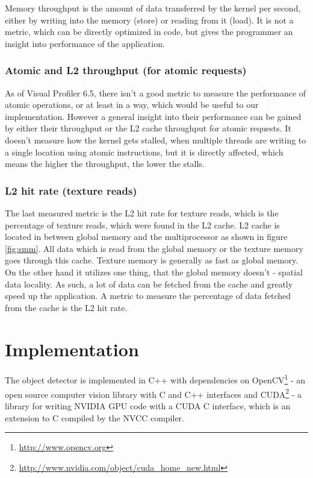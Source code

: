 Memory throughput is the amount of data transferred by the kernel per second, either by writing into the memory (store) or reading from it (load). It is not a metric, which can be directly optimized in code, but gives the programmer an insight into performance of the application.

\subsection{Atomic and L2 throughput (for atomic requests)}\label{subsec:metrics-atomics-throughput}

As of Visual Profiler 6.5, there isn't a good metric to measure the performance of atomic operations, or at least in a way, which would be useful to our implementation. However a general insight into their performance can be gained by either their throughput or the L2 cache throughput for atomic requests. It doesn't measure how the kernel gets stalled, when multiple threads are writing to a single location using atomic instructions, but it is directly affected, which means the higher the throughput, the lower the stalls.

\subsection{L2 hit rate (texture reads)} \label{subsec:metrics-l2-hit-rate-texture}

The last measured metric is the L2 hit rate for texture reads, which is the percentage of texture reads, which were found in the L2 cache. L2 cache is located in between global memory and the multiprocessor as shown in figure \ref{fig:smm}. All data which is read from the global memory or the texture memory goes through this cache. Texture memory is generally as fast as global memory. On the other hand it utilizes one thing, that the global memory doesn't - spatial data locality. As such, a lot of data can be fetched from the cache and greatly speed up the application. A metric to measure the percentage of data fetched from the cache is the L2 hit rate.

\chapter{Implementation}\label{ch:implementation}

The object detector is implemented in C++ with dependencies on OpenCV\footnote{\url{http://www.opencv.org}} - an open source computer vision library with C and C++ interfaces and CUDA\footnote{\url{http://www.nvidia.com/object/cuda_home_new.html}} - a library for writing NVIDIA GPU code with a CUDA C interface, which is an extension to C compiled by the NVCC compiler.

